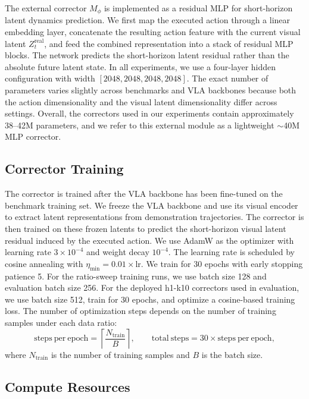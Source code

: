 The external corrector $M_\phi$ is implemented as a residual MLP for short-horizon latent dynamics prediction. We first map the executed action through a linear embedding layer, concatenate the resulting action feature with the current visual latent $Z_t^{\mathrm{real}}$, and feed the combined representation into a stack of residual MLP blocks. The network predicts the short-horizon latent residual rather than the absolute future latent state. In all experiments, we use a four-layer hidden configuration with width $[2048,2048,2048,2048]$. The exact number of parameters varies slightly across benchmarks and VLA backbones because both the action dimensionality and the visual latent dimensionality differ across settings. Overall, the correctors used in our experiments contain approximately 38--42M parameters, and we refer to this external module as a lightweight $\sim$40M MLP corrector.

\subsection{Corrector Training}
\label{app:corrector_training}

The corrector is trained after the VLA backbone has been fine-tuned on the benchmark training set. We freeze the VLA backbone and use its visual encoder to extract latent representations from demonstration trajectories. The corrector is then trained on these frozen latents to predict the short-horizon visual latent residual induced by the executed action. We use AdamW as the optimizer with learning rate $3\times10^{-4}$ and weight decay $10^{-4}$. The learning rate is scheduled by cosine annealing with $\eta_{\min}=0.01\times\mathrm{lr}$. We train for 30 epochs with early stopping patience 5. For the ratio-sweep training runs, we use batch size 128 and evaluation batch size 256. For the deployed h1-k10 correctors used in evaluation, we use batch size 512, train for 30 epochs, and optimize a cosine-based training loss. The number of optimization steps depends on the number of training samples under each data ratio:
\[
\mathrm{steps\ per\ epoch}=\left\lceil \frac{N_{\mathrm{train}}}{B} \right\rceil,
\qquad
\mathrm{total\ steps}=30\times \mathrm{steps\ per\ epoch},
\]
where $N_{\mathrm{train}}$ is the number of training samples and $B$ is the batch size.

\subsection{Compute Resources}
\label{app:compute_resources}

